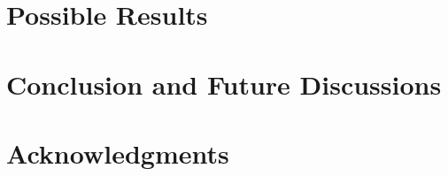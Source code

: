\documentclass{sigchi}
\begin{document}
\section{Possible Results}



\section{Conclusion and Future Discussions}



\section{Acknowledgments}


%
%
%
%
%
\balance{}



\balance{}



\end{document}
